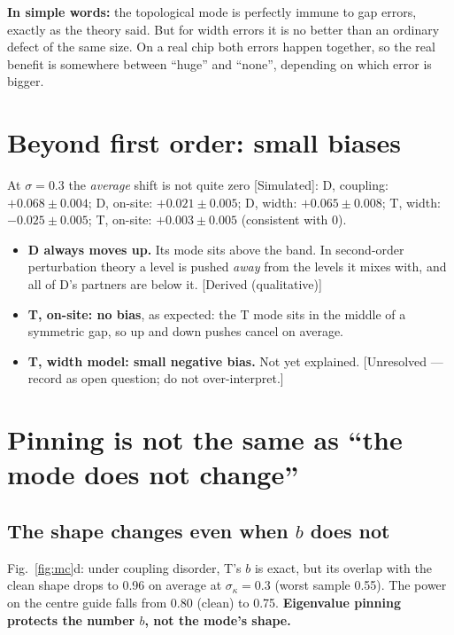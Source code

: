 \documentclass[10pt,a4paper]{article}
\newcommand{\evd}[1]{\textsf{\small[#1]}}
\newcommand{\simple}[1]{\par\noindent\textbf{In simple words:} #1\par\smallskip}
\begin{document}
\simple{the topological mode is perfectly immune to gap errors, exactly as the theory said. But for width errors it is no better than an ordinary defect of the same size. On a real chip both errors happen together, so the real benefit is somewhere between ``huge'' and ``none'', depending on which error is bigger.}

\section{Beyond first order: small biases}
At $\sigma=0.3$ the \emph{average} shift is not quite zero \evd{Simulated}:
D, coupling: $+0.068\pm0.004$; D, on-site: $+0.021\pm0.005$; D, width: $+0.065\pm0.008$; T, width: $-0.025\pm0.005$; T, on-site: $+0.003\pm0.005$ (consistent with 0).
\begin{itemize}[itemsep=1pt]
\item \textbf{D always moves up.} Its mode sits above the band. In second-order perturbation theory a level is pushed \emph{away} from the levels it mixes with, and all of D's partners are below it. \evd{Derived (qualitative)}
\item \textbf{T, on-site: no bias}, as expected: the T mode sits in the middle of a symmetric gap, so up and down pushes cancel on average.
\item \textbf{T, width model: small negative bias.} Not yet explained. \evd{Unresolved --- record as open question; do not over-interpret.}
\end{itemize}

\section{Pinning is not the same as ``the mode does not change''}
\subsection{The shape changes even when $b$ does not}
Fig.~\ref{fig:mc}d: under coupling disorder, T's $b$ is exact, but its overlap with the clean shape drops to 0.96 on average at $\sigma_\kappa=0.3$ (worst sample 0.55). The power on the centre guide falls from 0.80 (clean) to 0.75. \textbf{Eigenvalue pinning protects the number $b$, not the mode's shape.}
\end{document}
